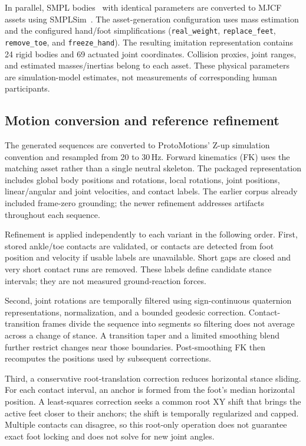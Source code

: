 \documentclass[11pt]{article}
\begin{document}
In parallel, SMPL bodies~\cite{smpl} with identical parameters are converted
to MJCF assets using SMPLSim~\cite{smplsim}. The asset-generation configuration
uses mass estimation and the configured hand/foot simplifications
(\texttt{real\_weight}, \texttt{replace\_feet}, \texttt{remove\_toe}, and
\texttt{freeze\_hand}). The resulting imitation representation contains
24 rigid bodies and 69 actuated joint coordinates. Collision proxies, joint
ranges, and estimated masses/inertias belong to each asset. These physical
parameters are simulation-model estimates, not measurements of corresponding
human participants.

\subsection{Motion conversion and reference refinement}\label{sec:refinement}

The generated sequences are converted to ProtoMotions' Z-up simulation
convention and resampled from 20 to 30\,Hz. Forward kinematics (FK) uses the
matching asset rather than a single neutral skeleton. The packaged
representation includes global body positions and rotations, local rotations,
joint positions, linear/angular and joint velocities, and contact labels.
The earlier corpus already included frame-zero grounding; the newer
refinement addresses artifacts throughout each sequence.

Refinement is applied independently to each variant in the following order.
First, stored ankle/toe contacts are validated, or contacts are detected from
foot position and velocity if usable labels are unavailable. Short gaps are
closed and very short contact runs are removed. These labels define candidate
stance intervals; they are not measured ground-reaction forces.

Second, joint rotations are temporally filtered using sign-continuous
quaternion representations, normalization, and a bounded geodesic correction.
Contact-transition frames divide the sequence into segments so filtering does
not average across a change of stance. A transition taper and a limited
smoothing blend further restrict changes near those boundaries.
Post-smoothing FK then recomputes the positions used by subsequent corrections.

Third, a conservative root-translation correction reduces horizontal stance
sliding. For each contact interval, an anchor is formed from the foot's median
horizontal position. A least-squares correction seeks a common root XY shift
that brings the active feet closer to their anchors; the shift is temporally
regularized and capped. Multiple contacts can disagree, so this root-only
operation does not guarantee exact foot locking and does not solve for new
joint angles.
\end{document}
